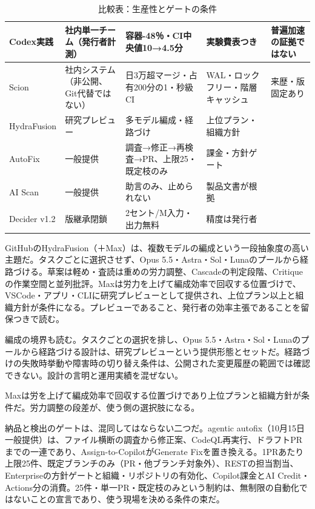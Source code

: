\documentclass[lualatex,a4paper,10pt]{jlreq}
\begin{document}
\begin{table}[htbp]\centering\footnotesize
\caption{比較表：生産性とゲートの条件}
\begin{tabularx}{0.96\linewidth}{@{}lXXXX@{}}
\toprule
Codex実践 & 社内単一チーム（発行者計測） & 容器-48％・CI中央値10→4.5分 & 実験費表つき & 普遍加速の証拠ではない \cite{B31} \\
\midrule
Scion & 社内システム（非公開、Git代替ではない） & 日3万超マージ・占有200分の1・秒級CI & WAL・ロックフリー・階層キャッシュ & 来歴・版固定あり \cite{B32,B75} \\
\midrule
HydraFusion & 研究プレビュー & 多モデル編成・経路づけ & 上位プラン・組織方針 \cite{B33,B76} \\
\midrule
AutoFix & 一般提供 & 調査→修正→再検査→PR、上限25・既定枝のみ & 課金・方針ゲート \cite{B34,B77} \\
\midrule
AI Scan & 一般提供 & 助言のみ、止められない & 製品文書が根拠 \cite{B35,B78} \\
\midrule
Decider v1.2 & 版継承閉鎖 & 2セント/M入力・出力無料 & 精度は発行者 \cite{B37,B36,B38} \\
\bottomrule
\end{tabularx}
\end{table}


GitHubのHydraFusion（＋Max）は、複数モデルの編成という一段抽象度の高い主題だ。タスクごとに選択させず、Opus 5.5・Astra・Sol・Lunaのプールから経路づける。草案は軽め・査読は重めの労力調整、Cascadeの判定段階、Critiqueの作業空間と並列批評。Maxは労力を上げて編成効率で回収する位置づけで、VSCode・アプリ・CLIに研究プレビューとして提供され、上位プラン以上と組織方針が条件になる。プレビューであること、発行者の効率主張であることを留保つきで読む。
\cite{B33,B76}


編成の境界も読む。タスクごとの選択を排し、Opus 5.5・Astra・Sol・Lunaのプールから経路づける設計は、研究プレビューという提供形態とセットだ。経路づけの失敗時挙動や障害時の切り替え条件は、公開された変更履歴の範囲では確認できない。設計の言明と運用実績を混ぜない。
\cite{B33,B76}


Maxは労を上げて編成効率で回収する位置づけであり上位プランと組織方針が条件だ。労力調整の段差が、使う側の選択肢になる。
\cite{B33,B76}


納品と検出のゲートは、混同してはならない二つだ。agentic autofix（10月15日一般提供）は、ファイル横断の調査から修正案、CodeQL再実行、ドラフトPRまでの一連であり、Assign-to-CopilotがGenerate Fixを置き換える。1PRあたり上限25件、既定ブランチのみ（PR・他ブランチ対象外）、RESTの担当割当、Enterpriseの方針ゲートと組織・リポジトリの有効化、Copilot課金とAI Credit・Actions分の消費。25件・単一PR・既定枝のみという制約は、無制限の自動化ではないことの宣言であり、使う現場を決める条件の束だ。
\cite{B34,B77}
\end{document}
